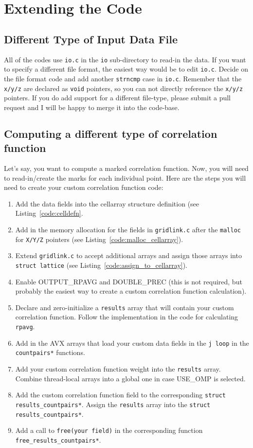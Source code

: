 \documentclass[12pt,titlepage]{article}
\let\stdsection\section
\begin{document}
\clearpage
\stdsection{Extending the Code}
\subsection{Different Type of Input Data File}
All of the codes use \texttt{io.c} in the \texttt{io} sub-directory to read-in the data. If you want to specify a different file format, the easiest way would be to edit 
\texttt{io.c}. Decide on the file format code and add another \texttt{strncmp} case in \texttt{io.c}. Remember that the \texttt{x/y/z} are declared as \texttt{void} pointers, 
so you can not directly reference the \texttt{x/y/z} pointers. If you do add support for a different file-type, please submit a pull request and I will be happy to merge it into the 
code-base. 

\subsection{Computing a different type of correlation function}
Let's say, you want to compute a marked correlation function. Now, you will need to read-in/create the marks for each individual point. Here are the steps 
you will need to create your custom correlation function code:
\begin{enumerate}
\item Add the data fields into the cellarray structure definition (see Listing~\ref{code:celldefn}.
\item Add in the memory allocation for the fields in \texttt{gridlink.c} after the \texttt{malloc} for \texttt{X/Y/Z} pointers (see Listing~\ref{code:malloc_cellarray}).
\item Extend \texttt{gridlink.c} to accept additional arrays and assign those arrays into \texttt{struct lattice} (see Listing~\ref{code:assign_to_cellarray}).
\item Enable OUTPUT\_RPAVG and DOUBLE\_PREC (this is not required, but probably the easiest way to create a custom correlation function calculation).
\item Declare and zero-initialize a \texttt{results} array that will contain your custom correlation function. Follow the implementation in the code for calculating \texttt{rpavg}.
\item Add in the AVX arrays that load your custom data fields in the \texttt{j loop} in the \texttt{countpairs*} functions.
\item Add your custom correlation function weight into the \texttt{results} array. Combine thread-local arrays into a global one in case USE\_OMP is selected. 
\item Add the custom correlation function field to the corresponding \texttt{struct results\_countpairs*}. Assign the \texttt{results} array into the \texttt{struct results\_countpairs*}.
\item Add a call to \texttt{free(your field)} in the corresponding function \texttt{free\_results\_countpairs*}.
\end{enumerate}
\end{document}
